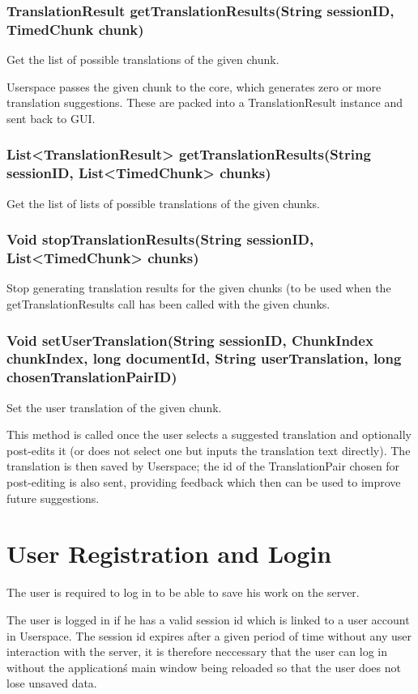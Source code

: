 \subsubsection{TranslationResult getTranslationResults(String sessionID, TimedChunk chunk)}
Get the list of possible translations of the given chunk.

Userspace passes the given chunk to the core, which generates zero or more translation suggestions.
These are packed into a TranslationResult instance and sent back to GUI.

\subsubsection{List<TranslationResult> getTranslationResults(String sessionID, List<TimedChunk> chunks)}
Get the list of lists of possible translations of the given chunks.

\subsubsection{Void stopTranslationResults(String sessionID, List<TimedChunk> chunks)}
Stop generating translation results for the given chunks
(to be used when the getTranslationResults call has been called
with the given chunks.

\subsubsection{Void setUserTranslation(String sessionID, ChunkIndex chunkIndex, long documentId, String userTranslation, long chosenTranslationPairID)}
Set the user translation of the given chunk.

This method is called once the user selects a suggested translation and optionally post-edits it
(or does not select one but inputs the translation text directly).
The translation is then saved by Userspace;
the id of the TranslationPair chosen for post-editing is also sent, providing feedback which then can be used to improve future suggestions.

\section{User Registration and Login}

The user is required to log in to be able to save his work on the server.

The user is logged in if he has a valid session id which is linked to a user account in Userspace.
The session id expires after a given period of time without any user interaction with the server,
it is therefore neccessary that the user can log in without the application\'s main window being reloaded so that the user does not lose unsaved data.


